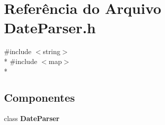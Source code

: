 \section{Referência do Arquivo Date\+Parser.\+h}
\label{_date_parser_8h}
{\ttfamily \#include $<$string$>$}\\*
{\ttfamily \#include $<$map$>$}\\*
\subsection*{Componentes}
\begin{DoxyCompactItemize}
\item 
class {\bf Date\+Parser}
\end{DoxyCompactItemize}
